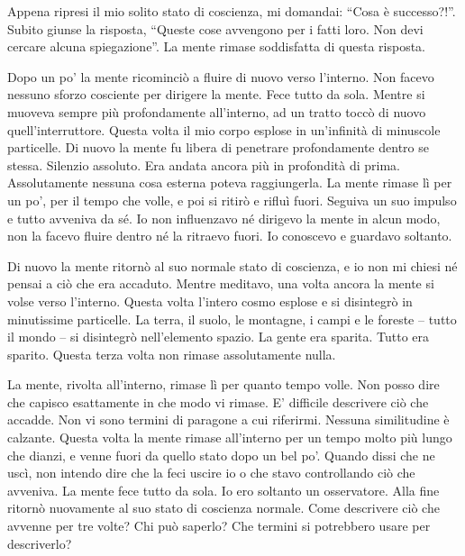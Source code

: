 Appena ripresi il mio solito stato di coscienza, mi domandai: ``Cosa è
successo?!''. Subito giunse la risposta, ``Queste cose avvengono per i
fatti loro. Non devi cercare alcuna spiegazione''. La mente rimase
soddisfatta di questa risposta.

Dopo un po' la mente ricominciò a fluire di nuovo verso l'interno. Non
facevo nessuno sforzo cosciente per dirigere la mente. Fece tutto da
sola. Mentre si muoveva sempre più profondamente all'interno, ad un
tratto toccò di nuovo quell'interruttore. Questa volta il mio corpo
esplose in un'infinità di minuscole particelle. Di nuovo la mente fu
libera di penetrare profondamente dentro se stessa. Silenzio assoluto.
Era andata ancora più in profondità di prima. Assolutamente nessuna cosa
esterna poteva raggiungerla. La mente rimase lì per un po', per il tempo
che volle, e poi si ritirò e rifluì fuori. Seguiva un suo impulso e
tutto avveniva da sé. Io non influenzavo né dirigevo la mente in alcun
modo, non la facevo fluire dentro né la ritraevo fuori. Io conoscevo e
guardavo soltanto.

Di nuovo la mente ritornò al suo normale stato di coscienza, e io non mi
chiesi né pensai a ciò che era accaduto. Mentre meditavo, una volta
ancora la mente si volse verso l'interno. Questa volta l'intero cosmo
esplose e si disintegrò in minutissime particelle. La terra, il suolo,
le montagne, i campi e le foreste -- tutto il mondo -- si disintegrò
nell'elemento spazio. La gente era sparita. Tutto era sparito. Questa
terza volta non rimase assolutamente nulla.

La mente, rivolta all'interno, rimase lì per quanto tempo volle. Non
posso dire che capisco esattamente in che modo vi rimase. E' difficile
descrivere ciò che accadde. Non vi sono termini di paragone a cui
riferirmi. Nessuna similitudine è calzante. Questa volta la mente rimase
all'interno per un tempo molto più lungo che dianzi, e venne fuori da
quello stato dopo un bel po'. Quando dissi che ne uscì, non intendo dire
che la feci uscire io o che stavo controllando ciò che avveniva. La
mente fece tutto da sola. Io ero soltanto un osservatore. Alla fine
ritornò nuovamente al suo stato di coscienza normale. Come descrivere
ciò che avvenne per tre volte? Chi può saperlo? Che termini si
potrebbero usare per descriverlo?

\clearpage


